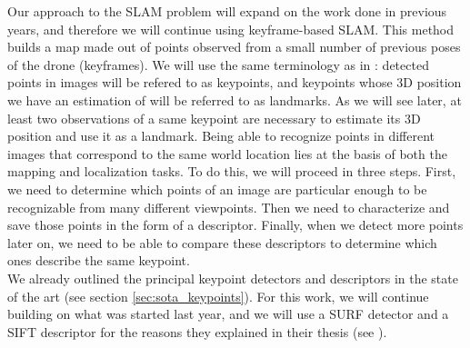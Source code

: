Our approach to the SLAM problem will expand on the work done in previous years, and therefore we will continue using keyframe-based SLAM. This method builds a map made out of points observed from a small number of previous poses of the drone (keyframes). We will use the same terminology as in \cite{engel2011msc}: detected points in images will be refered to as keypoints, and keypoints whose 3D position we have an estimation of will be referred to as landmarks. As we will see later, at least two observations of a same keypoint are necessary to estimate its 3D position and use it as a landmark. Being able to recognize points in different images that correspond to the same world location lies at the basis of both the mapping and localization tasks. To do this, we will proceed in three steps. First, we need to determine which points of an image are particular enough to be recognizable from many different viewpoints. Then we need to characterize and save those points in the form of a descriptor. Finally, when we detect more points later on, we need to be able to compare these descriptors to determine which ones describe the same keypoint.\\
We already outlined the principal keypoint detectors and descriptors in the state of the art (see section \ref{sec:sota_keypoints}). For this work, we will continue building on what was started last year, and we will use a SURF detector and a SIFT descriptor for the reasons they explained in their thesis (see  \cite{jacquesleclere}).

